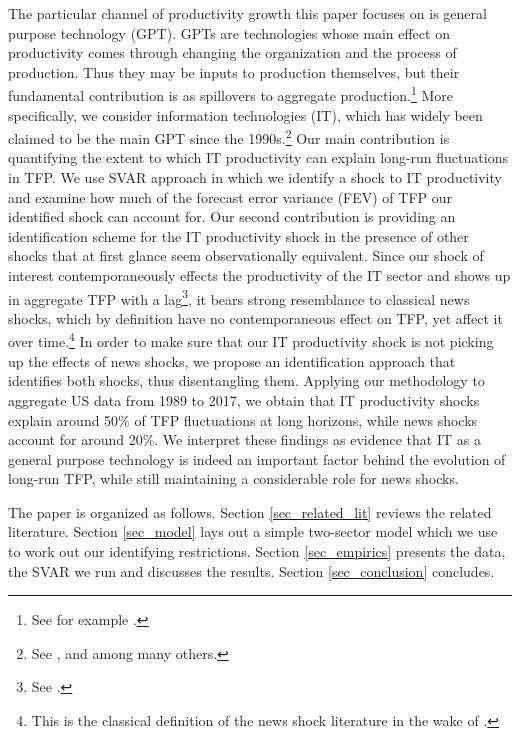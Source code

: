 \documentclass[11pt]{article}
\renewcommand{\[}{\begin{equation}}
\renewcommand{\]}{\end{equation}}
\begin{document}
The particular channel of productivity growth this paper focuses on is general purpose technology (GPT). GPTs are technologies whose main effect on productivity comes through changing the organization and the process of production. Thus they may be inputs to production themselves, but their fundamental contribution is as spillovers to aggregate production.\footnote{See for example \cite{bresnahan_trajtenberg1992}.} More specifically, we consider information technologies (IT), which has widely been claimed to be the main GPT since the 1990s.\footnote{See \cite{basu_etal2004}, \cite{brynjolfsson_etal1994} and \cite{allstar_paper} among many others.} Our main contribution is quantifying the extent to which IT productivity can explain long-run fluctuations in TFP. We use SVAR approach in which we identify a shock to IT productivity and examine how much of the forecast error variance (FEV) of TFP our identified shock can account for. Our second contribution is providing an identification scheme for the IT productivity shock in the presence of other shocks that at first glance seem observationally equivalent. Since our shock of interest contemporaneously effects the productivity of the IT sector and shows up in aggregate TFP with a lag\footnote{See \cite{david1989}.}, it bears strong resemblance to classical news shocks, which by definition have no contemporaneous effect on TFP, yet affect it over time.\footnote{This is the classical definition of the news shock literature in the wake of \cite{beaudry_portier2006}.} In order to make sure that our IT productivity shock is not picking up the effects of news shocks, we propose an identification approach that identifies both shocks, thus disentangling them. 
Applying our methodology to aggregate US data from 1989 to 2017, we obtain that IT productivity shocks explain around 50\% of TFP fluctuations at long horizons, while news shocks account for around 20\%. We interpret these findings as evidence that IT as a general purpose technology is indeed an important factor behind the evolution of long-run TFP, while still maintaining a considerable role for news shocks. 

The paper is organized as follows. Section \ref{sec_related_lit} reviews the related literature. Section \ref{sec_model} lays out a simple two-sector model which we use to work out our identifying restrictions. Section \ref{sec_empirics} presents the data, the SVAR we run and discusses the results. Section \ref{sec_conclusion} concludes. 


\end{document}

